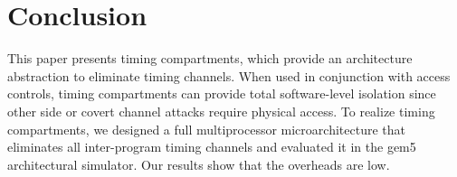\section{Conclusion}
This paper presents timing compartments, which provide an architecture 
abstraction to eliminate timing channels. When used in conjunction with access 
controls, timing compartments can provide total software-level isolation since 
other side or covert channel attacks require physical access. To realize 
timing compartments, we designed a full multiprocessor microarchitecture 
that eliminates all inter-program timing channels and evaluated it in the gem5 
architectural simulator. Our results show that the overheads are low.
